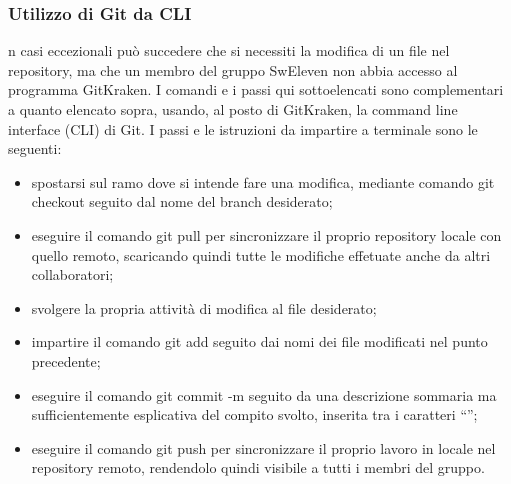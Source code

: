 \subsubsection{Utilizzo di Git da CLI}
n casi eccezionali può succedere che si necessiti la modifica di un file nel repository, ma che un membro del gruppo SwEleven non abbia accesso al programma GitKraken. I comandi e i passi qui sottoelencati sono complementari a quanto elencato sopra, usando, al posto di GitKraken, la command line interface (CLI) di Git. I passi e le istruzioni da impartire a terminale sono le seguenti:
\begin{itemize}
	\item spostarsi sul ramo dove si intende fare una modifica, mediante comando git checkout seguito dal nome del branch desiderato;
	\item eseguire il comando git pull per sincronizzare il proprio repository locale con quello remoto, scaricando quindi tutte le modifiche effetuate anche da altri collaboratori;
	\item svolgere la propria attività di modifica al file desiderato;
	\item impartire il comando git add seguito dai nomi dei file modificati nel punto precedente;
	\item eseguire il comando git commit -m seguito da una descrizione sommaria ma sufficientemente esplicativa del compito svolto, inserita tra i caratteri “”;
	\item eseguire il comando git push per sincronizzare il proprio lavoro in locale nel repository remoto, rendendolo quindi visibile a tutti i membri del gruppo.
\end{itemize}


